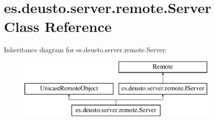 \hypertarget{classes_1_1deusto_1_1server_1_1remote_1_1_server}{}\section{es.\+deusto.\+server.\+remote.\+Server Class Reference}
\label{classes_1_1deusto_1_1server_1_1remote_1_1_server}
Inheritance diagram for es.\+deusto.\+server.\+remote.\+Server\+:\begin{figure}[H]
\begin{center}
\leavevmode
\includegraphics[height=3.000000cm]{classes_1_1deusto_1_1server_1_1remote_1_1_server}
\end{center}
\end{figure}
